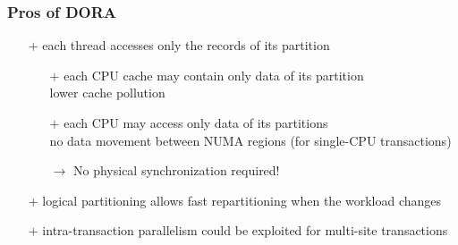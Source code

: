 \begin{frame}
	\frametitle{Pros of DORA}
	
	\begin{itemize}
		\item[$+$]	each thread accesses only the records of its partition
			\begin{itemize}
				\item[$+$]	each CPU cache may contain only data of its partition \\ \bm{$\rightarrow$} lower cache pollution
				\item[$+$]	each CPU may access only data of its partitions \\ \bm{$\rightarrow$} no data movement between NUMA regions (for single-CPU transactions)
				\item[$\rightarrow$]	No physical synchronization required!
			\end{itemize}
		\item[$+$]	logical partitioning allows fast repartitioning when the workload changes
		\item[$+$]	intra-transaction parallelism could be exploited for multi-site transactions
	\end{itemize}
	

\end{frame}
